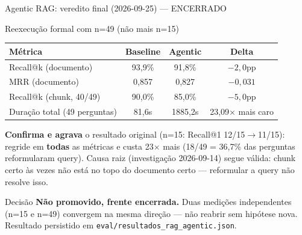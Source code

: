 \documentclass{beamer}
\newenvironment{numerobloco}[1]{\begin{block}{#1}}{\end{block}}
\newenvironment{decisaobloco}[1]{\begin{alertblock}{#1}}{\end{alertblock}}
\begin{document}
\begin{frame}{Agentic RAG: veredito final (2026-09-25) — ENCERRADO}
  \small
  \begin{numerobloco}{Reexecução formal com n=49 (não mais n=15)}
    \begin{center}
    \footnotesize
    \begin{tabular}{lccc}
      \toprule
      \textbf{Métrica} & \textbf{Baseline} & \textbf{Agentic} & \textbf{Delta} \\
      \midrule
      Recall@k (documento) & 93,9\% & 91,8\% & $-2,0$pp \\
      MRR (documento)      & 0,857  & 0,827  & $-0,031$ \\
      Recall@k (chunk, 40/49) & 90,0\% & 85,0\% & $-5,0$pp \\
      Duração total (49 perguntas) & 81,6s & 1885,2s & \alert{23,09$\times$ mais caro} \\
      \bottomrule
    \end{tabular}
    \end{center}
  \end{numerobloco}

  \pause
  \textbf{Confirma e agrava} o resultado original (n=15: Recall@1 12/15$\to$11/15): regride em
  \textbf{todas} as métricas e custa 23$\times$ mais (18/49 = 36,7\% das perguntas
  reformularam query). Causa raiz (investigação 2026-09-14) segue válida: chunk certo às
  vezes não está no topo do documento certo — reformular a query não resolve isso.

  \pause
  \begin{decisaobloco}{Decisão}
    \textbf{Não promovido, frente encerrada.} Duas medições independentes (n=15 e n=49)
    convergem na mesma direção — não reabrir sem hipótese nova. Resultado persistido em
    \texttt{eval/resultados\_rag\_agentic.json}.
  \end{decisaobloco}
\end{frame}
\end{document}
